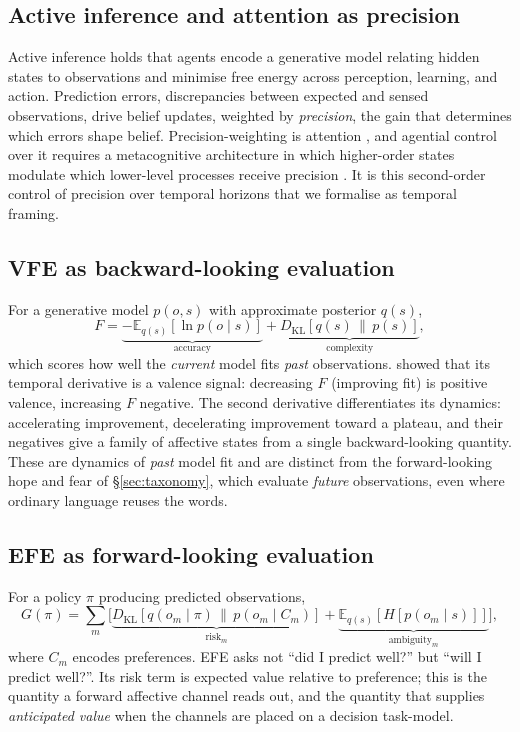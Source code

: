 \documentclass[11pt,a4paper]{article}
\begin{document}
\subsection{Active inference and attention as precision}
Active inference holds that agents encode a generative model relating hidden states
to observations and minimise free energy across perception, learning, and action.
Prediction errors, discrepancies between expected and sensed observations, drive
belief updates, weighted by \emph{precision}, the gain that determines which errors
shape belief. Precision-weighting is attention \citep{feldman2010attention}, and
agential control over it requires a metacognitive architecture in which higher-order
states modulate which lower-level processes receive precision \citep{sandvedsmith2021}.
It is this second-order control of precision over temporal horizons that we formalise
as temporal framing.

\subsection{VFE as backward-looking evaluation}
For a generative model $p(o,s)$ with approximate posterior $q(s)$,
\begin{equation}
F = \underbrace{-\mathbb{E}_{q(s)}[\ln p(o\mid s)]}_{\text{accuracy}}
  + \underbrace{D_{\mathrm{KL}}[q(s)\,\|\,p(s)]}_{\text{complexity}} ,
\end{equation}
which scores how well the \emph{current} model fits \emph{past} observations.
\citet{joffily2013emotional} showed that its temporal derivative is a valence signal:
decreasing $F$ (improving fit) is positive valence, increasing $F$ negative. The
second derivative differentiates its dynamics: accelerating improvement, decelerating
improvement toward a plateau, and their negatives give a family of affective states
from a single backward-looking quantity. These are dynamics of \emph{past} model fit
and are distinct from the forward-looking hope and fear of \S\ref{sec:taxonomy}, which
evaluate \emph{future} observations, even where ordinary language reuses the words.

\subsection{EFE as forward-looking evaluation}
For a policy $\pi$ producing predicted observations,
\begin{equation}
G(\pi) = \sum_m \Big[\underbrace{D_{\mathrm{KL}}[q(o_m\mid\pi)\,\|\,p(o_m\mid C_m)]}_{\text{risk}_m}
       + \underbrace{\mathbb{E}_{q(s)}[H[p(o_m\mid s)]]}_{\text{ambiguity}_m}\Big] ,
\end{equation}
where $C_m$ encodes preferences. EFE asks not ``did I predict well?'' but ``will I
predict well?''. Its risk term is expected value relative to preference; this is the
quantity a forward affective channel reads out, and the quantity that supplies
\emph{anticipated value} when
the channels are placed on a decision task-model.
\end{document}

